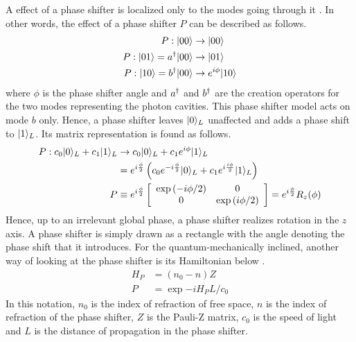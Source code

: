 A effect of a phase shifter is localized only to the modes going through it \cite{klm}. In other words, the effect of a phase shifter $P$ can be described as follows.
\begin{align}
P:|00\rangle &\rightarrow |00\rangle\\
P:|01\rangle = a^\dagger|00\rangle &\rightarrow |01\rangle\\
P:|10\rangle = b^\dagger|00\rangle &\rightarrow e^{i\phi}|10\rangle
\end{align}
where $\phi$ is the phase shifter angle and $a^\dagger$ and $b^\dagger$ are the creation operators for the two modes representing the photon cavities. This phase shifter model acts on mode $b$ only. Hence, a phase shifter leaves $|0\rangle_L$ unaffected and adds a phase shift to $|1\rangle_L$. Its matrix representation is found as follows.
\begin{align}
P:c_0|0\rangle_L + c_1|1\rangle_L &\rightarrow c_0|0\rangle_L + c_1e^{i\phi}|1\rangle_L \\
&= e^{i\frac{\phi}{2}}\left(c_0e^{-i\frac{\phi}{2}}|0\rangle_L + c_1e^{i\frac{i\phi}{2}}|1\rangle_L\right)\\
P &\equiv e^{i\frac{\phi}{2}}\left[\begin{array}{cc}\text{exp}\left(-i\phi/2\right) & 0\\
0 & \text{exp}\left(i\phi/2\right)\end{array}\right] = e^{i\frac{\phi}{2}}R_z(\phi)
\end{align}
Hence, up to an irrelevant global phase, a phase shifter realizes rotation in the $z$ axis. A phase shifter is simply drawn as a rectangle with the angle denoting the phase shift that it introduces. For the quantum-mechanically inclined, another way of looking at the phase shifter is its Hamiltonian  below \cite{nielsen2000}.
\begin{align}
H_P &= (n_0 - n)Z\\
P &= \exp{-iH_PL/c_0}
\end{align}
In this notation, $n_0$ is the index of refraction of free space, $n$ is the index of refraction of the phase shifter, $Z$ is the Pauli-Z matrix, $c_0$ is the speed of light and $L$ is the distance of propagation in the phase shifter.


